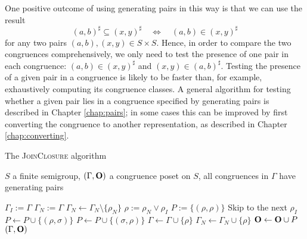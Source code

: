 One positive outcome of using generating pairs in this way is that we can use
the result
$$(a,b)^\sharp \subseteq (x,y)^\sharp \quad\iff\quad (a,b) \in (x,y)^\sharp$$
for any two pairs $(a,b), (x,y) \in S \times S$.  Hence, in order to compare the
two congruences comprehensively, we only need to test the presence of one pair
in each congruence: $(a,b) \in (x,y)^\sharp$ and $(x,y) \in (a,b)^\sharp$.
Testing the presence of a given pair in a congruence is likely to be faster
than, for example, exhaustively computing its congruence classes.  A general
algorithm for testing whether a given pair lies in a congruence specified by
generating pairs is described in Chapter \ref{chap:pairs}; in some cases this
can be improved by first converting the congruence to another representation, as
described in Chapter \ref{chap:converting}.


\begin{algorithm}
  \caption{The \textsc{JoinClosure} algorithm}
  \label{alg:join-closure}
  \begin{algorithmic}[1]
    \Require
    $S$ a finite semigroup,
    $(\Gamma,\mathbf{O})$ a congruence poset on $S$,
    all congruences in $\Gamma$ have generating pairs
    
      \State $\Gamma_I := \Gamma$ 
      \State $\Gamma_N := \Gamma$ 
          \State $\Gamma_N \gets \Gamma_N \setminus \{\rho_N\}$
            \State $\rho := \rho_N \vee \rho_I$
            \State $P := \{(\rho, \rho)\}$
            \For{$\sigma \in \Gamma$}
              \If{$\rho \subseteq \sigma$}
                \If{$\sigma \subseteq \rho$}
                  \State Skip to the next $\rho_I$
                  \Comment{$\rho = \sigma$}
                \Else
                  \State $P \gets P \cup \{(\rho, \sigma)\}$
                \EndIf
              \ElsIf{$\sigma \subseteq \rho$}
                \State $P \gets P \cup \{(\sigma, \rho)\}$
              \EndIf
            \EndFor
            \State $\Gamma \gets \Gamma \cup \{\rho\}$
            \State $\Gamma_N \gets \Gamma_N \cup \{\rho\}$
            \State $\mathbf{O} \gets \mathbf{O} \cup P$
          \EndFor
        \EndFor
      \EndWhile
      \State \Return $(\Gamma, \mathbf{O})$
    \EndProcedure
  \end{algorithmic}
\end{algorithm}

